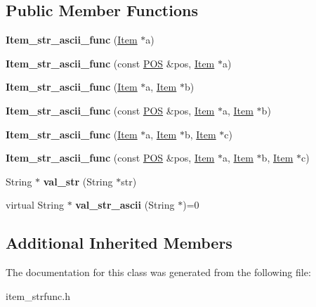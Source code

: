 \subsection*{Public Member Functions}
\begin{DoxyCompactItemize}
\item 
\mbox{\label{classItem__str__ascii__func_accd542d530bad982468bc4caff7d61d8}} 
{\bfseries Item\+\_\+str\+\_\+ascii\+\_\+func} (\mbox{\hyperlink{classItem}{Item}} $\ast$a)
\item 
\mbox{\label{classItem__str__ascii__func_ac621ec3a9fdf07d791a643ccc4440ad0}} 
{\bfseries Item\+\_\+str\+\_\+ascii\+\_\+func} (const \mbox{\hyperlink{structYYLTYPE}{P\+OS}} \&pos, \mbox{\hyperlink{classItem}{Item}} $\ast$a)
\item 
\mbox{\label{classItem__str__ascii__func_a2f8c013cc2ee2cd3320177c2a6576bf3}} 
{\bfseries Item\+\_\+str\+\_\+ascii\+\_\+func} (\mbox{\hyperlink{classItem}{Item}} $\ast$a, \mbox{\hyperlink{classItem}{Item}} $\ast$b)
\item 
\mbox{\label{classItem__str__ascii__func_ab7dfa6ffb047bcc81d99e92dc2afdbd9}} 
{\bfseries Item\+\_\+str\+\_\+ascii\+\_\+func} (const \mbox{\hyperlink{structYYLTYPE}{P\+OS}} \&pos, \mbox{\hyperlink{classItem}{Item}} $\ast$a, \mbox{\hyperlink{classItem}{Item}} $\ast$b)
\item 
\mbox{\label{classItem__str__ascii__func_aa15eeac334b22f7c62d56c391428844b}} 
{\bfseries Item\+\_\+str\+\_\+ascii\+\_\+func} (\mbox{\hyperlink{classItem}{Item}} $\ast$a, \mbox{\hyperlink{classItem}{Item}} $\ast$b, \mbox{\hyperlink{classItem}{Item}} $\ast$c)
\item 
\mbox{\label{classItem__str__ascii__func_a39f307a939f3630c337648e5bdc3a622}} 
{\bfseries Item\+\_\+str\+\_\+ascii\+\_\+func} (const \mbox{\hyperlink{structYYLTYPE}{P\+OS}} \&pos, \mbox{\hyperlink{classItem}{Item}} $\ast$a, \mbox{\hyperlink{classItem}{Item}} $\ast$b, \mbox{\hyperlink{classItem}{Item}} $\ast$c)
\item 
\mbox{\label{classItem__str__ascii__func_a87f28c1987ca698523653ef25ad115a4}} 
String $\ast$ {\bfseries val\+\_\+str} (String $\ast$str)
\item 
\mbox{\label{classItem__str__ascii__func_ab76c1acda78ff011c7eca8003444bc3f}} 
virtual String $\ast$ {\bfseries val\+\_\+str\+\_\+ascii} (String $\ast$)=0
\end{DoxyCompactItemize}
\subsection*{Additional Inherited Members}


The documentation for this class was generated from the following file\+:\begin{DoxyCompactItemize}
\item 
item\+\_\+strfunc.\+h\end{DoxyCompactItemize}
